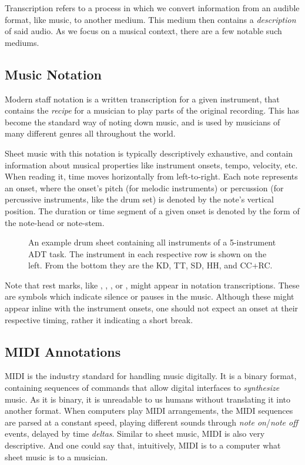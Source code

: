 Transcription refers to a process in which we convert information from an audible format, like music, to another medium. This medium then contains a \textit{description} of said audio. As we focus on a musical context, there are a few notable such mediums.

\subsection{Music Notation}

Modern staff notation is a written transcription for a given instrument, that contains the \textit{recipe} for a musician to play parts of the original recording. This has become the standard way of noting down music, and is used by musicians of many different genres all throughout the world.

Sheet music with this notation is typically descriptively exhaustive, and contain information about musical properties like instrument onsets, tempo, velocity, etc. When reading it, time moves horizontally from left-to-right. Each note represents an onset, where the onset's pitch (for melodic instruments) or percussion (for percussive instruments, like the drum set) is denoted by the note's vertical position. The duration or time segment of a given onset is denoted by the form of the note-head or note-stem.

\begin{figure}[H]
    \centering
    
    \caption{An example drum sheet containing all instruments of a 5-instrument \gls{ADT} task. The instrument in each respective row is shown on the left. From the bottom they are the \acrfull{KD}, \acrfull{TT}, \acrfull{SD}, \acrfull{HH}, and \acrfull{CC+RC}.}
    \label{DrumsheetFigure}
\end{figure}

Note that rest marks, like \HaPa, \ViPa, \AcPa, or \SePa, might appear in notation transcriptions. These are symbols which indicate silence or pauses in the music. Although these might appear inline with the instrument onsets, one should not expect an onset at their respective timing, rather it indicating a short break.

\subsection{MIDI Annotations}

\gls{MIDI} is the industry standard for handling music digitally. It is a binary format, containing sequences of commands that allow digital interfaces to \textit{synthesize} music. As it is binary, it is unreadable to us humans without translating it into another format. When computers play \gls{MIDI} arrangements, the \gls{MIDI} sequences are parsed at a constant speed, playing different sounds through \textit{note on}/\textit{note off} events, delayed by time \textit{deltas}. Similar to sheet music, \gls{MIDI} is also very descriptive. And one could say that, intuitively, \gls{MIDI} is to a computer what sheet music is to a musician.

